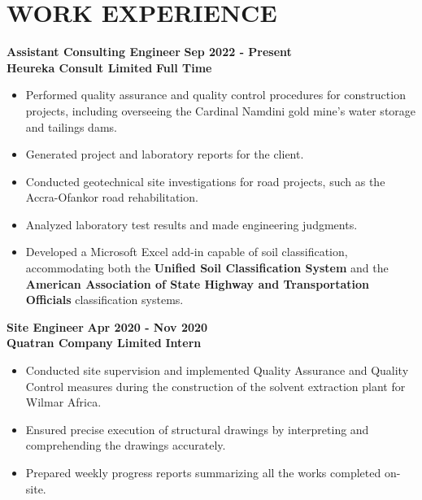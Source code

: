 \documentclass[letterpaper, 12pt]{article}
\newcommand{\cvsection}[1]{
	
	\section*{#1}
}
\newcommand{\verticalSpace}{4pt}
\newcommand{\itemizeMargin}{11pt}
\begin{document}
	
	\cvsection{WORK EXPERIENCE}
	
	\textbf{Assistant Consulting Engineer} \hfill \textbf{Sep 2022 - Present} \\ [\verticalSpace]
	\textbf{Heureka Consult Limited} \hfill \textbf{Full Time}
	
	\begin{itemize}[leftmargin=\itemizeMargin]
		
		\item Performed quality assurance and quality control procedures for construction projects, including overseeing the Cardinal Namdini gold mine's water storage and tailings dams.
		\item Generated project and laboratory reports for the client.
		\item Conducted geotechnical site investigations for road projects, such as the Accra-Ofankor road rehabilitation.		
		\item Analyzed laboratory test results and made engineering judgments.
		
		
		\item Developed a Microsoft Excel add-in capable of soil classification, accommodating both the \textbf{Unified Soil Classification System} and the \textbf{American Association of State Highway and Transportation Officials} classification systems.	
		
	\end{itemize} 
	
	\textbf{Site Engineer} \hfill \textbf{Apr 2020 - Nov 2020} \\ [\verticalSpace]
	\textbf{Quatran Company Limited} \hfill \textbf{Intern}
	
	\begin{itemize}[leftmargin=\itemizeMargin]
		
		\item Conducted site supervision and implemented Quality Assurance and Quality Control measures during the construction of the solvent extraction plant for Wilmar Africa.	
		\item Ensured precise execution of structural drawings by interpreting and comprehending the drawings accurately.
		\item Prepared weekly progress reports summarizing all the works completed on-site.

	\end{itemize}
	
\end{document}
